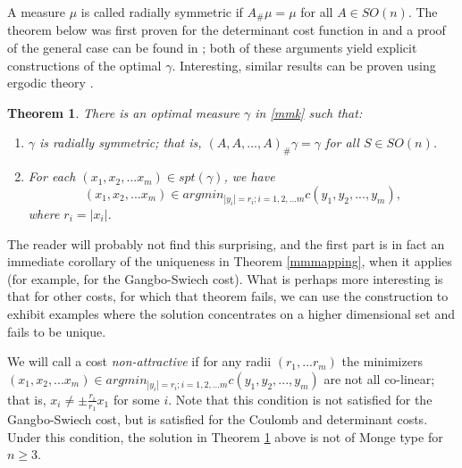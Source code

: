 \documentclass[letter,10pt]{article}
\theoremstyle{dotless}
\begin{document}
A measure $\mu$ is called radially symmetric if $A_{\#} \mu =\mu$ for all $A \in SO(n)$.  The theorem below was first proven for the determinant cost function in\cite{CN} and a proof of the general case can be found in \cite{P13b}; both of these arguments yield explicit constructions of the optimal $\gamma$.  Interesting, similar results can be proven using ergodic theory \cite{moameni}.


\newtheorem{radial}{Theorem}[subsection]
\begin{radial}\label{radial}
There is an optimal measure $\gamma$ in \eqref{mmk} such that:
\begin{enumerate}
\item $\gamma$ is radially symmetric; that is, $(A,A,...,A)_{\#}\gamma =\gamma$ for all $S \in SO(n)$.
\item For each $(x_1,x_2,...x_m) \in spt(\gamma)$, we have 
\begin{equation}\label{spheremin}
(x_1,x_2,...x_m) \in argmin_{|y_i|=r_i; i=1,2,...m}c(y_1,y_2,...,y_m),
\end{equation}
where $r_i =|x_i|$.
\end{enumerate}
\end{radial}

The reader will probably not find this surprising, and the first part  is in fact an immediate corollary of the uniqueness in Theorem \ref{mmmapping}, when it applies (for example, for the Gangbo-Swiech cost). What is perhaps more interesting is that for other costs, for which that theorem fails, we can use the construction to exhibit examples where the solution concentrates on a higher dimensional set and fails to be unique.

We will call a cost \textit{non-attractive} if for any radii $(r_1,...r_m)$ the minimizers $(x_1,x_2,...x_m) \in argmin_{|y_i|=r_i; i=1,2,...m}c(y_1,y_2,...,y_m)$ are not all co-linear; that is, $x_i \neq \pm \frac{r_i}{r_1}x_1$ for some $i$. Note that this condition is not satisfied for the Gangbo-Swiech cost, but is satisfied for the Coulomb and determinant costs.  Under this condition, the solution in Theorem \ref{radial} above is  not of Monge type for $n \geq 3$.
\end{document}
